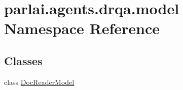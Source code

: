 \hypertarget{namespaceparlai_1_1agents_1_1drqa_1_1model}{}\section{parlai.\+agents.\+drqa.\+model Namespace Reference}
\label{namespaceparlai_1_1agents_1_1drqa_1_1model}
\subsection*{Classes}
\begin{DoxyCompactItemize}
\item 
class \hyperlink{classparlai_1_1agents_1_1drqa_1_1model_1_1DocReaderModel}{Doc\+Reader\+Model}
\end{DoxyCompactItemize}
